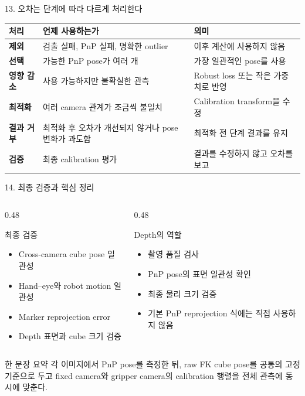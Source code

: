 \documentclass[aspectratio=169,11pt]{beamer}
\begin{document}
\begin{frame}{13. 오차는 단계에 따라 다르게 처리한다}
  \begin{tabularx}{\textwidth}{>{\bfseries}p{}X X}
    \toprule
    처리 & 언제 사용하는가 & 의미 \\
    \midrule
    제외 & 검출 실패, PnP 실패, 명확한 outlier & 이후 계산에 사용하지 않음 \\
    선택 & 가능한 PnP pose가 여러 개 & 가장 일관적인 pose를 사용 \\
    영향 감소 & 사용 가능하지만 불확실한 관측 & Robust loss 또는 작은 가중치로 반영 \\
    최적화 & 여러 camera 관계가 조금씩 불일치 & Calibration transform을 수정 \\
    결과 거부 & 최적화 후 오차가 개선되지 않거나 pose 변화가 과도함 & 최적화 전 단계 결과를 유지 \\
    검증 & 최종 calibration 평가 & 결과를 수정하지 않고 오차를 보고 \\
    \bottomrule
  \end{tabularx}
\end{frame}

\begin{frame}{14. 최종 검증과 핵심 정리}
  \begin{columns}[T]
    \begin{column}{0.48\textwidth}
      \begin{block}{최종 검증}
        \begin{itemize}
          \item Cross-camera cube pose 일관성
          \item Hand--eye와 robot motion 일관성
          \item Marker reprojection error
          \item Depth 표면과 cube 크기 검증
        \end{itemize}
      \end{block}
    \end{column}
    \begin{column}{0.48\textwidth}
      \begin{block}{Depth의 역할}
        \begin{itemize}
          \item 촬영 품질 검사
          \item PnP pose의 표면 일관성 확인
          \item 최종 물리 크기 검증
          \item 기본 PnP reprojection 식에는 직접 사용하지 않음
        \end{itemize}
      \end{block}
    \end{column}
  \end{columns}

  \vfill
  \begin{alertblock}{한 문장 요약}
    각 이미지에서 PnP pose를 측정한 뒤, raw FK cube pose를 공통의 고정 기준으로 두고 fixed camera와 gripper
    camera의 calibration 행렬을 전체 관측에 동시에 맞춘다.
  \end{alertblock}
\end{frame}
\end{document}
